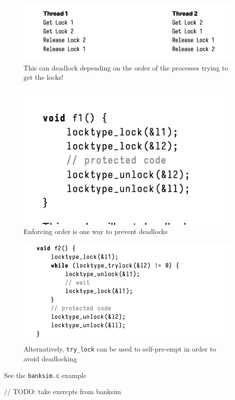 \documentclass[../notes.tex]{subfiles}
\begin{document}
\begin{figure}[H]
    \centering
    \includegraphics[width=0.8\linewidth]{img/image_2023-03-08-14-58-38.png}
    \caption{This can deadlock depending on the order of the processes trying to get the locks!}
\end{figure}


\begin{figure}[H]
    \centering
    \includegraphics[width=0.8\linewidth]{img/image_2023-03-08-14-59-08.png}
    \caption{Enforcing order is one way to prevent deadlocks}
\end{figure}


\begin{figure}[H]
    \centering
    \includegraphics[width=0.8\linewidth]{img/image_2023-03-08-14-59-23.png}
    \caption{Alternatively, \texttt{try\_lock} can be used to self-pre-empt in order to avoid deadlocking}
\end{figure}


See the \texttt{banksim.c} example


// TODO: take exercpts from banksim
\end{document}
